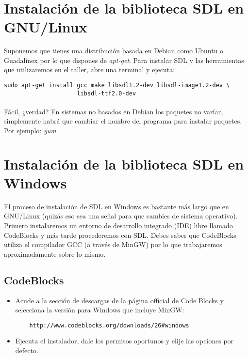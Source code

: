 \documentclass[16pt,spanish]{article}
\begin{document}
\section{Instalación de la biblioteca SDL en GNU/Linux}
\label{sec:linux}

\paragraph{}
Suponemos que tienes una distribución basada en Debian como Ubuntu o Guadalinex
por lo que dispones de \emph{apt-get}. Para instalar SDL y las herramientas
que utilizaremos en el taller, abre una terminal y ejecuta:

\begin{verbatim}
sudo apt-get install gcc make libsdl1.2-dev libsdl-image1.2-dev \
                     libsdl-ttf2.0-dev
\end{verbatim}

\paragraph{}
Fácil, ¿verdad? En sistemas no basados en Debian los paquetes no varían, simplemente habrá
que cambiar el nombre del programa para instalar paquetes. Por ejemplo:
\emph{yum}.

\section{Instalación de la biblioteca SDL en Windows}

\paragraph{}
El proceso de instalación de SDL en Windows es bastante más largo que en GNU/Linux
(quizás eso sea una señal para que cambies de sistema operativo). Primero
instalaremos un entorno de desarrollo integrado (IDE) libre llamado CodeBlocks
y más tarde procederemos con SDL. Debes saber que CodeBlocks utiliza el compilador
GCC (a través de MinGW) por lo que trabajaremos aproximadamente sobre lo mismo.

\subsection{CodeBlocks}

\begin{itemize}
	\item Acude a la sección de descargas de la página official de Code Blocks
	y selecciona la versión para Windows que incluye MinGW:
	\begin{verbatim}
	http://www.codeblocks.org/downloads/26#windows
	\end{verbatim}
	\item Ejecuta el instalador, dale los permisos oportunos y elije las opciones
	por defecto.
\end{itemize}
\end{document}
